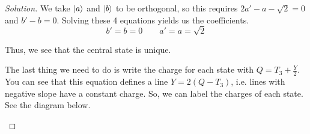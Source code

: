 \documentclass[12pt]{article}
\newenvironment{solution}{\begin{proof}[Solution]}{\end{proof}}
\begin{document}
\begin{solution}
We take $\ket{a}$ and $\ket{b}$ to be orthogonal, so this requires $2a'-a-\sqrt{2}=0$ and $b'-b=0$. Solving these 4 equations yields us the coefficients.
\begin{equation*}
    b'=b=0\qquad a'=a=\sqrt{2}
\end{equation*}

Thus, we see that the central state is unique.

The last thing we need to do is write the charge for each state with $Q=T_3+\frac{Y}{2}$. You can see that this equation defines a line $Y=2(Q-T_3)$, i.e. lines with negative slope have a constant charge. So, we can label the charges of each state. See the diagram below.

\begin{figure}[t]
    \centering
\end{figure}

\end{solution}
\end{document}
